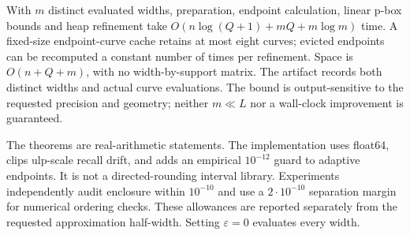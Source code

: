 With $m$ distinct evaluated widths, preparation, endpoint calculation,
linear p-box bounds and heap refinement take
$O(n\log(Q+1)+mQ+m\log m)$ time.
A fixed-size endpoint-curve cache retains at most eight curves; evicted
endpoints can be recomputed a constant number of times per refinement.
Space is $O(n+Q+m)$, with no width-by-support matrix.
The artifact records both distinct widths and actual curve evaluations.
The bound is output-sensitive to the requested precision and geometry;
neither $m\ll L$ nor a wall-clock improvement is guaranteed.

The theorems are real-arithmetic statements. The implementation uses
float64, clips ulp-scale recall drift, and adds an empirical $10^{-12}$
guard to adaptive endpoints. It is not a directed-rounding interval library.
Experiments independently audit enclosure within $10^{-10}$ and use a
$2\cdot10^{-10}$ separation margin for numerical ordering checks.
These allowances are reported separately from the requested approximation
half-width. Setting $\varepsilon=0$ evaluates every width.
